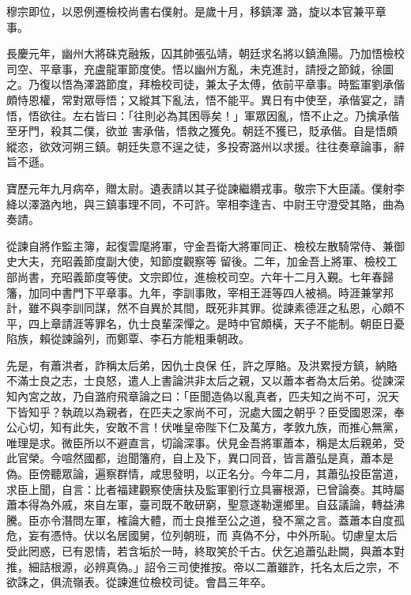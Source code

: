 \begin{pinyinscope}
 穆宗即位，以恩例遷檢校尚書右僕射。是歲十月，移鎮澤
 潞，旋以本官兼平章事。



 長慶元年，幽州大將硃克融叛，囚其帥張弘靖，朝廷求名將以鎮漁陽。乃加悟檢校司空、平章事，充盧龍軍節度使。悟以幽州方亂，未克進討，請授之節鉞，徐圖之。乃復以悟為澤潞節度，拜檢校司徒，兼太子太傅，依前平章事。時監軍劉承偕頗恃恩權，常對眾辱悟；又縱其下亂法，悟不能平。異日有中使至，承偕宴之，請悟，悟欲往。左右皆曰：「往則必為其困辱矣！」軍眾因亂，悟不止之。乃擒承偕至牙門，殺其二僕，欲並
 害承偕，悟救之獲免。朝廷不獲已，貶承偕。自是悟頗縱恣，欲效河朔三鎮。朝廷失意不逞之徒，多投寄潞州以求援。往往奏章論事，辭旨不遜。



 寶歷元年九月病卒，贈太尉。遺表請以其子從諫繼纘戎事。敬宗下大臣議。僕射李絳以澤潞內地，與三鎮事理不同，不可許。宰相李逢吉、中尉王守澄受其賂，曲為奏請。



 從諫自將作監主簿，起復雲麾將軍，守金吾衛大將軍同正、檢校左散騎常侍、兼御史大夫，充昭義節度副大使，知節度觀察等
 留後。二年，加金吾上將軍、檢校工部尚書，充昭義節度等使。文宗即位，進檢校司空。六年十二月入覲。七年春歸籓，加同中書門下平章事。九年，李訓事敗，宰相王涯等四人被禍。時涯兼掌邦計，雖不與李訓同謀，然不自異於其間，既死非其罪。從諫素德涯之私恩，心頗不平，四上章請涯等罪名，仇士良輩深憚之。是時中官頗橫，天子不能制。朝臣日憂陷族，賴從諫論列，而鄭覃、李石方能粗秉朝政。



 先是，有蕭洪者，詐稱太后弟，因仇士良保
 任，許之厚賂。及洪累授方鎮，納賂不滿士良之志，士良怒，遣人上書論洪非太后之親，又以蕭本者為太后弟。從諫深知內宮之故，乃自潞府飛章論之曰：「臣聞造偽以亂真者，匹夫知之尚不可，況天下皆知乎？執疏以為親者，在匹夫之家尚不可，況處大國之朝乎？臣受國恩深，奉公心切，知有此失，安敢不言！伏唯皇帝陛下仁及萬方，孝敦九族，而推心無黨，唯理是求。微臣所以不避直言，切論深事。伏見金吾將軍蕭本，稱是太后親弟，受
 此官榮。今喧然國都，迨聞籓府，自上及下，異口同音，皆言蕭弘是真，蕭本是偽。臣傍聽眾論，遍察群情，咸思發明，以正名分。今年二月，其蕭弘投臣當道，求臣上聞，自言：比者福建觀察使唐扶及監軍劉行立具審根源，已曾論奏。其時屬蕭本得為外戚，來自左軍，臺司既不敢研窮，聖意遂勒還鄉里。自茲議論，轉益沸騰。臣亦令潛問左軍，榷論大體，而士良推至公之道，發不黨之言。蓋蕭本自度孤危，妄有憑恃。伏以名居國舅，位列朝班，而
 真偽不分，中外所恥。切慮皇太后受此罔惑，已有恩情，若含垢於一時，終取笑於千古。伏乞追蕭弘赴闕，與蕭本對推，細詰根源，必辨真偽。」詔令三司使推按。帝以二蕭雖詐，托名太后之宗，不欲誅之，俱流嶺表。從諫進位檢校司徒。會昌三年卒。




\end{pinyinscope}
